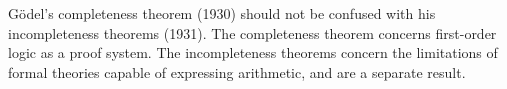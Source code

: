 \begin{remark*}
Gödel's completeness theorem (1930) should not be confused with his
incompleteness theorems (1931). The completeness theorem concerns first-order
logic as a proof system. The incompleteness theorems concern the limitations of
formal theories capable of expressing arithmetic, and are a separate result.
\end{remark*}
